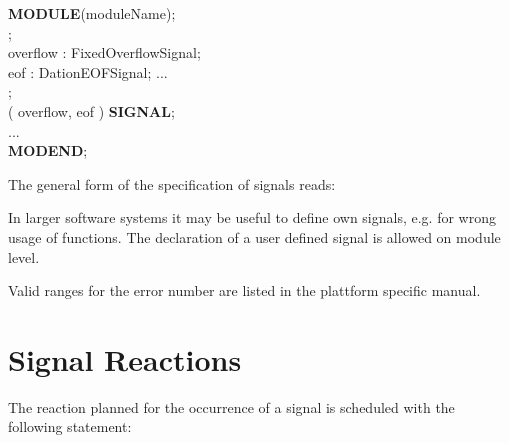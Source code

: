 {\bf MODULE}(moduleName);\\
;\\
\x \x overflow : FixedOverflowSignal;\\
\x \x eof : DationEOFSignal;
\x \x ...\\
;\\
\x {} ( overflow, eof ) {\bf SIGNAL};\\
\x \x ... \\
{\bf MODEND};

The general form of the specification of signals reads:




In larger software systems it may be useful to define own signals, e.g.
for wrong usage of functions. 
The declaration of a user defined signal is allowed on module level.



Valid ranges for the error number are listed in the plattform specific manual.


\section{Signal Reactions}
The reaction planned for the occurrence of a signal is scheduled with
the following statement:


